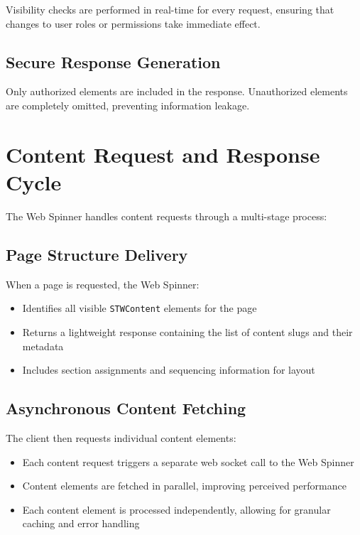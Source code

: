 Visibility checks are performed in real-time for every request, ensuring that changes to user roles or permissions take immediate effect.

\subsection{Secure Response Generation}

Only authorized elements are included in the response. Unauthorized elements are completely omitted, preventing information leakage.

\section{Content Request and Response Cycle}
\label{sec:content-cycle}

The Web Spinner handles content requests through a multi-stage process:

\subsection{Page Structure Delivery}

When a page is requested, the Web Spinner:
\begin{itemize}
	\item Identifies all visible \texttt{STWContent} elements for the page
	\item Returns a lightweight response containing the list of content slugs and their metadata
	\item Includes section assignments and sequencing information for layout
\end{itemize}

\subsection{Asynchronous Content Fetching}

The client then requests individual content elements:
\begin{itemize}
	\item Each content request triggers a separate web socket call to the Web Spinner
	\item Content elements are fetched in parallel, improving perceived performance
	\item Each content element is processed independently, allowing for granular caching and error handling
\end{itemize}

